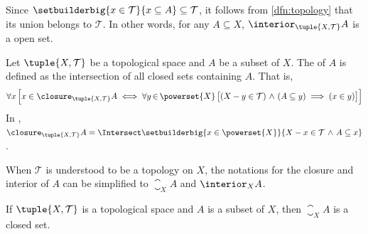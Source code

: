 \begin{cor}
     \label{cor:topological-space-interior-is-an-openset}
    Since \( \setbuilderbig{x \in \mathcal{T}}{x \subseteq A} \subseteq \mathcal{T} \), it follows from
    \cref{dfn:topology} that its union belongs to \( \mathcal{T} \).
    In other words, for any \( A \subseteq X \), \( \interior_{\tuple{X, \mathcal{T}}}{A} \) is a open set.
\end{cor}

\begin{dfn}[Closure]
     \label{dfn:topological-space-closure}
    Let \( \tuple{X, \mathcal{T}} \) be a topological space and \( A \) be a subset of \( X \). The 
    of \( A \) is defined as the intersection of all closed sets containing \( A \). That is,
    \begin{equation*}
        \forall x \, \Big[ x \in \closure_{\tuple{X, \mathcal{T}}}{A}
            \iff
            \forall y\,{\in}\,\powerset{X} \, \big[ \mleft(  X - y \in \mathcal{T} \mright) \,\,{\land}\,\, \mleft( A \subseteq y \mright) \implies \mleft( x \in y \mright) \big]
        \Big]
    \end{equation*}
    In ,
    \( \closure_{\tuple{X, \mathcal{T}}}{A} = \Intersect \setbuilderbig{x \in \powerset{X}}{X - x \in \mathcal{T} \,\,{\land}\,\, A \subseteq x} \).
\end{dfn}

\begin{notation}
     \label{notation:topological-space-closure-and-interior}
    When \( \mathcal{T} \) is understood to be a topology on \( X \),
    the notations for the closure and interior of \( A \) can be simplified to
    \( \closure_{X}{A} \) and \( \interior_{X}{A} \).
\end{notation}

\begin{thm}
     \label{thm:topological-space-closure-of-a-subset-is-a-closed-set}
    If \( \tuple{X, \mathcal{T}} \) is a topological space and \( A \) is a subset of \( X \), then
    \( \closure_{X}{A} \) is a closed set.
\end{thm}

